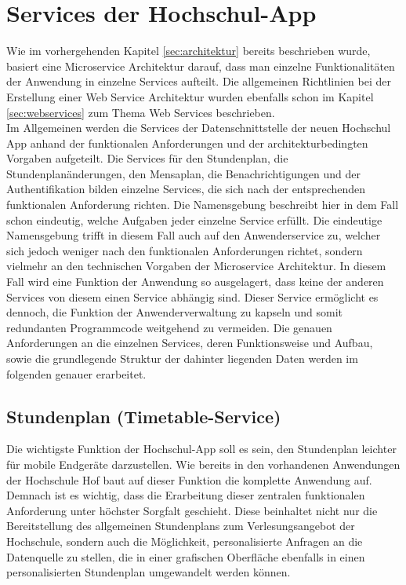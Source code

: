 \chapter{Services der Hochschul-App}
\label{sec:appservices}

Wie im vorhergehenden Kapitel \ref{sec:architektur} bereits beschrieben wurde, basiert eine Microservice Architektur darauf, dass man einzelne Funktionalitäten der Anwendung in einzelne Services aufteilt. Die allgemeinen Richtlinien bei der Erstellung einer Web Service Architektur wurden ebenfalls schon im Kapitel \ref{sec:webservices} zum Thema Web Services beschrieben. 
\\
\linebreak
Im Allgemeinen werden die Services der Datenschnittstelle der neuen Hochschul App anhand der funktionalen Anforderungen und der architekturbedingten Vorgaben aufgeteilt. Die Services für den Stundenplan, die Stundenplanänderungen, den Mensaplan, die Benachrichtigungen und der Authentifikation bilden einzelne Services, die sich nach der entsprechenden funktionalen Anforderung richten. Die Namensgebung beschreibt hier in dem Fall schon eindeutig, welche Aufgaben jeder einzelne Service erfüllt. Die eindeutige Namensgebung trifft in diesem Fall auch auf den Anwenderservice zu, welcher sich jedoch weniger nach den funktionalen Anforderungen richtet, sondern vielmehr an den technischen Vorgaben der Microservice Architektur. In diesem Fall wird eine Funktion der Anwendung so ausgelagert, dass keine der anderen Services von diesem einen Service abhängig sind. Dieser Service ermöglicht es dennoch, die Funktion der Anwenderverwaltung zu kapseln und somit redundanten Programmcode weitgehend zu vermeiden. Die genauen Anforderungen an die einzelnen Services, deren Funktionsweise und Aufbau, sowie die grundlegende Struktur der dahinter liegenden Daten werden im folgenden genauer erarbeitet.  

\section{Stundenplan (Timetable-Service)}
\label{sec:stundenplan}

Die wichtigste Funktion der Hochschul-App soll es sein, den Stundenplan leichter für mobile Endgeräte darzustellen. Wie bereits in den vorhandenen Anwendungen der Hochschule Hof baut auf dieser Funktion die komplette Anwendung auf. Demnach ist es wichtig, dass die Erarbeitung dieser zentralen funktionalen Anforderung unter höchster Sorgfalt geschieht. Diese beinhaltet nicht nur die Bereitstellung des allgemeinen Stundenplans zum Verlesungsangebot der Hochschule, sondern auch die Möglichkeit, personalisierte Anfragen an die Datenquelle zu stellen, die in einer grafischen Oberfläche ebenfalls in einen personalisierten Stundenplan umgewandelt werden können. 

